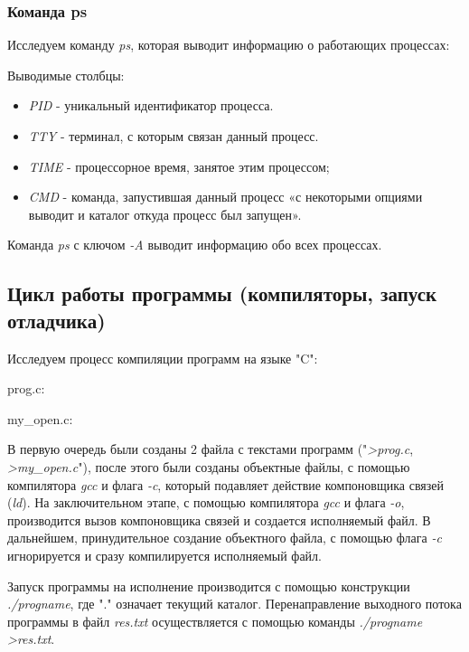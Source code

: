 \documentclass[14pt,a4paper,report]{report}
\begin{document}
\clearpage

\subsubsection{Команда ps}

Исследуем команду \emph{ps}, которая выводит информацию о работающих процессах:



Выводимые столбцы:

\begin{itemize}
	\item \emph{PID} - уникальный идентификатор процесса.
	\item \emph{TTY} - терминал, с которым связан данный процесс.
	\item \emph{TIME} - процессорное время, занятое этим процессом;
	\item \emph{CMD} - команда, запустившая данный процесс «с некоторыми опциями выводит и каталог откуда процесс был запущен».
\end{itemize}

Команда \emph{ps} с ключом \emph{-A} выводит информацию обо всех процессах. 

\subsection{Цикл работы программы (компиляторы, запуск отладчика)}

Исследуем процесс компиляции программ на языке "C":

prog.c:

my\_open.c:


В первую очередь были созданы 2 файла с текстами программ ("\emph{>prog.c}, \emph{>my\_open.c}"), после этого были созданы объектные файлы, с помощью компилятора \emph{gcc} и флага \emph{-c}, который подавляет действие компоновщика связей (\emph{ld}). На заключительном этапе, с помощью компилятора \emph{gcc} и флага \emph{-o}, производится вызов компоновщика связей и создается исполняемый файл. В дальнейшем, принудительное создание объектного файла, с помощью флага \emph{-c} игнорируется и сразу компилируется исполняемый файл.

Запуск программы на исполнение производится с помощью конструкции \emph{./progname}, где "." означает текущий каталог. Перенаправление выходного потока программы в файл \emph{res.txt} осуществляется с помощью команды \emph{./progname >res.txt}.
\end{document}
